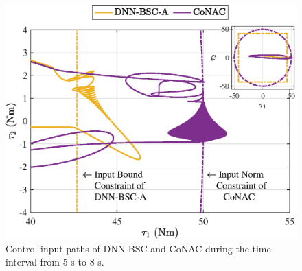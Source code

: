 \documentclass[lettersize,journal]{IEEEtran}
\begin{document}
\begin{figure}[!t]
    \centering
    {\includegraphics[width=0.9\linewidth]{fig/fig16.eps}
    \caption{Control input paths of DNN-BSC and CoNAC during the time interval from 5 s to 8 s.}
    \label{fig: ball control}}
\end{figure}
\end{document}
